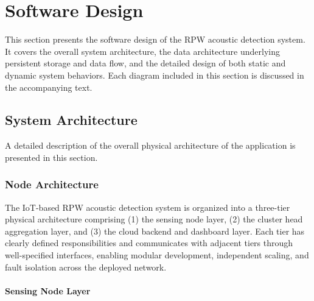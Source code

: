 \documentclass[12pt,a4paper,oneside]{memoir}
\begin{document}
\section{Software Design}

This section presents the software design of the RPW acoustic detection system. It covers the overall system architecture, the data architecture underlying persistent storage and data flow, and the detailed design of both static and dynamic system behaviors. Each diagram included in this section is discussed in the accompanying text.



\subsection{System Architecture}

A detailed description of the overall physical architecture of the application is presented in this section.

\subsubsection{Node Architecture}

The IoT-based RPW acoustic detection system is organized into a three-tier physical architecture comprising (1) the sensing node layer, (2) the cluster head aggregation layer, and (3) the cloud backend and dashboard layer. Each tier has clearly defined responsibilities and communicates with adjacent tiers through well-specified interfaces, enabling modular development, independent scaling, and fault isolation across the deployed network.

\paragraph{Sensing Node Layer} 
\end{document}
